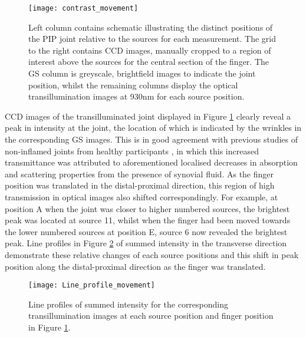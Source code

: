 \documentclass[twoside]{bhamthesis}
\theoremstyle{definition}
\begin{document}
\begin{figure}[!ht]
\centering\texttt{[image: contrast\_movement]}
\caption{Left column contains schematic illustrating the distinct positions of the PIP joint relative to the sources for each measurement. The grid to the right contains CCD images, manually cropped to a region of interest above the sources for the central section of the finger. The GS column is greyscale, brightfield images to indicate the joint position, whilst the remaining columns display the optical transillumination images at 930nm for each source position.}
\label{contrast_movement}
\end{figure}

CCD images of the transilluminated joint displayed in Figure \ref{contrast_movement} clearly reveal a peak in intensity at the joint, the location of which is indicated by the wrinkles in the corresponding GS images. This is in good agreement with previous studies of non-inflamed joints from healthy participants \cite{prapavat1995vivo,scheel2002assessment}, in which this increased transmittance was attributed to aforementioned localised decreases in absorption and scattering properties from the presence of synovial fluid. As the finger position was translated in the distal-proximal direction, this region of high transmission in optical images also shifted correspondingly. For example, at position A when the joint was closer to higher numbered sources, the brightest peak was located at source 11, whilst when the finger had been moved towards the lower numbered sources at position E, source 6 now revealed the brightest peak. Line profiles in Figure \ref{lin_profile_movement} of summed intensity in the transverse direction demonstrate these relative changes of each source positions and this shift in peak position along the distal-proximal direction as the finger was translated.


\begin{figure}[!ht]
\centering\texttt{[image: Line\_profile\_movement]}
\caption{Line profiles of summed intensity for the corresponding transillumination images at each source position and finger position in Figure \ref{contrast_movement}.}
\label{lin_profile_movement}
\end{figure}
\end{document}
